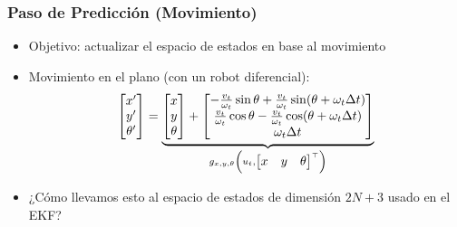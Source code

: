 \begin{frame}
    \frametitle{Paso de Predicción (Movimiento)}

    \begin{itemize}
        \item Objetivo: actualizar el espacio de estados en base al movimiento
        \item Movimiento en el plano (con un robot diferencial):
        \begin{equation*}
            \begin{bmatrix} x' \\ y' \\ \theta' \end{bmatrix} = 
            \underbrace{\begin{bmatrix} x \\ y \\ \theta \end{bmatrix} + 
            \begin{bmatrix} 
            -\frac{v_t}{\omega_t} \sin \theta + \frac{v_t}{\omega_t} \sin (\theta + \omega_t \Delta t) \\ 
            \frac{v_t}{\omega_t} \cos \theta - \frac{v_t}{\omega_t} \cos (\theta + \omega_t \Delta t) \\ 
            \omega_t \Delta t 
            \end{bmatrix}}_{g_{x,y,\theta}\left(u_{t}, \begin{bmatrix} x & y & \theta \end{bmatrix}^{\top}\right)}
        \end{equation*}
        \item ¿Cómo llevamos esto al espacio de estados de dimensión $2N+3$ usado en el EKF?
    \end{itemize}

\end{frame}

